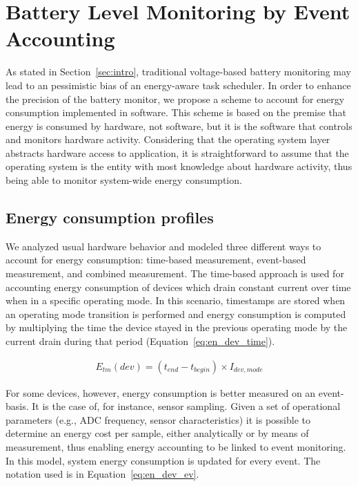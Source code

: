 \section{Battery Level Monitoring by Event Accounting}
\label{sec:account}

As stated in Section~\ref{sec:intro}, traditional voltage-based battery
monitoring may lead to an pessimistic bias of an energy-aware task scheduler. In
order to enhance the precision of the battery monitor, we propose a scheme to
account for energy consumption implemented in software. This scheme is based on
the premise that energy is consumed by hardware, not software, but it is the
software that controls and monitors hardware activity. Considering that the
operating system layer abstracts hardware access to application, it is
straightforward to assume that the operating system is the entity with most
knowledge about hardware activity, thus being able to monitor system-wide energy
consumption.

\subsection{Energy consumption profiles}
\label{sec:profiles}

We analyzed usual hardware behavior and modeled three different ways to account
for energy consumption: time-based measurement, event-based measurement, and
combined measurement.
The time-based approach is used for accounting energy consumption of devices
which drain constant current over time when in a specific operating mode. In
this scenario, timestamps are stored when an operating mode transition is
performed and energy consumption is computed by multiplying the time the device
stayed in the previous operating mode by the current drain during that period
(Equation~\ref{eq:en_dev_time}).

\begin{eqnarray}
E_{tm}(dev) = (t_{end} - t_{begin}) \times I_{dev,mode} \label{eq:en_dev_time}
\end{eqnarray}

For some devices, however, energy consumption is better measured on an
event-basis. It is the case of, for instance, sensor sampling. Given a set of
operational parameters (e.g., ADC frequency, sensor characteristics) it is
possible to determine an energy cost per sample, either analytically or by means
of measurement, thus enabling energy accounting to be linked to event
monitoring. In this model, system energy consumption is updated for every event.
The notation used is in Equation~\ref{eq:en_dev_ev}.

